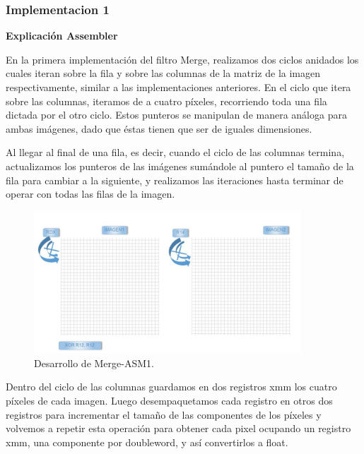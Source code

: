 \subsubsection{Implementacion 1}

\textbf{Explicación Assembler}

En la primera implementación del filtro Merge, realizamos dos ciclos anidados los cuales iteran sobre la fila y sobre las columnas de la matriz de la imagen respectivamente, similar a las implementaciones anteriores. En el ciclo que itera sobre las columnas, iteramos de a cuatro píxeles, recorriendo toda una fila dictada por el otro ciclo. Estos punteros se manipulan de manera análoga para ambas imágenes, dado que éstas tienen que ser de iguales dimensiones.

Al llegar al final de una fila, es decir, cuando el ciclo de las columnas termina, actualizamos los punteros de las imágenes sumándole al puntero el tamaño de la fila para cambiar a la siguiente, y realizamos las iteraciones hasta terminar de operar con todas las filas de la imagen.

\begin{figure}[ht!]
\centering
\includegraphics[width=100mm]{imagenes/merge/merge1-1.png}
\caption{Desarrollo de Merge-ASM1.}
\end{figure}

Dentro del ciclo de las columnas guardamos en dos registros xmm los cuatro píxeles de cada imagen. Luego desempaquetamos cada registro en otros dos registros para incrementar el tamaño de las componentes de los píxeles y volvemos a repetir esta operación para obtener cada pixel ocupando un registro xmm, una componente por doubleword, y así convertirlos a float.


